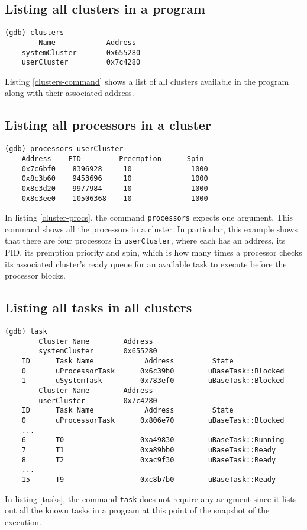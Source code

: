 \subsection{Listing all clusters in a \uCPPS program}
\begin{lstlisting}[caption={clusters command}, label={clusters-command}]
(gdb) clusters
        Name            Address
    systemCluster       0x655280
    userCluster         0x7c4280
\end{lstlisting}
Listing \ref{clusters-command} shows a list of all clusters available in the
program
along with their associated address.

\subsection{Listing all processors in a cluster}
\begin{lstlisting}[caption={\text{cluster\_procs} command}, label={cluster-procs}]
(gdb) processors userCluster
    Address    PID         Preemption      Spin
    0x7c6bf0    8396928     10              1000
    0x8c3b60    9453696     10              1000
    0x8c3d20    9977984     10              1000
    0x8c3ee0    10506368    10              1000
\end{lstlisting}
In listing \ref{cluster-procs}, the command \verb|processors| expects one
argument. This command shows
all the processors in a cluster. In particular, this example shows that there
are four processors in \verb|userCluster|, where each has an address,
its PID, its premption priority and spin, which is how many times a processor
checks its associated cluster's ready queue for an available task to execute
before the processor blocks.

\subsection{Listing all tasks in all clusters}
\begin{lstlisting}[caption={\text{tasks} command}, label={tasks},
basicstyle=\small]
(gdb) task
        Cluster Name        Address
        systemCluster       0x655280
    ID      Task Name            Address         State
    0       uProcessorTask      0x6c39b0        uBaseTask::Blocked
    1       uSystemTask         0x783ef0        uBaseTask::Blocked
        Cluster Name        Address
        userCluster         0x7c4280
    ID      Task Name            Address         State
    0       uProcessorTask      0x806e70        uBaseTask::Blocked
    ...
    6       T0                  0xa49830        uBaseTask::Running
    7       T1                  0xa89bb0        uBaseTask::Ready
    8       T2                  0xac9f30        uBaseTask::Ready
    ...
    15      T9                  0xc8b7b0        uBaseTask::Ready
\end{lstlisting}
In listing \ref{tasks}, the command \verb|task| does not require any
arugment since it lists out all the known tasks in a \uCPPS program at this
point of the snapshot of the execution.

